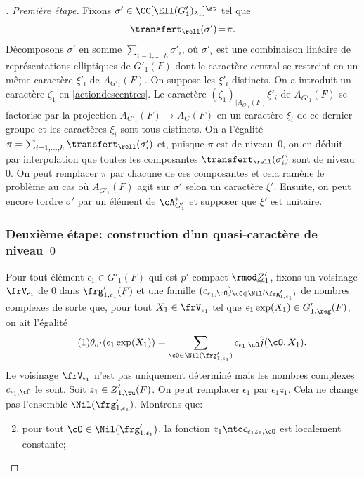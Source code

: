 \begin{proof}[\proofname. Première étape]
Fixons $\sigma'\in\CC[\Ell(G'_{1})_{\lambda_{1}}]^{\st}$ tel que \[
\transfert_{\rell}(\sigma')\!=\!\pi.
\]
Décomposons $\sigma'$ en somme $\sum_{i=1,\dots,h}\sigma'_{i}$, où $\sigma'_{i}$ est une combinaison linéaire de représentations elliptiques de $G'_{1}(F)$ dont le caractère central se restreint en un même carac\-tère $\xi'_{i}$ de $A_{G'_{1}}(F)$. On suppose les $\xi'_{i}$ distincts. On a introduit un caractère $\zeta_{1}$ en \ref{actiondescentres}. Le caractère $(\zeta_{1})_{ \vert A_{G'_{1}}(F)}\xi'_{i}$ de $A_{G'_{1}}(F)$ se factorise par la projection $A_{G'_{1}}(F)\to A_{G}(F)$ en un caractère $\xi_{i}$ de ce dernier groupe et les caractères $\xi_{i}$ sont tous distincts. On a l'égalité $\pi=\sum_{i=1,\dots,h}\transfert_{\rell}(\sigma'_{i})$ et, puisque $\pi$ est de niveau~$0$, on en déduit par interpolation que toutes les composantes $\transfert_{\rell}(\sigma'_{i})$ sont de niveau~$0$. On peut remplacer $\pi$ par chacune de ces composantes et cela ramène le problème au cas où $A_{G'_{1}}(F)$ agit sur $\sigma'$ selon un caractère $\xi'$. Ensuite, on peut encore tordre $\sigma'$ par un élément de $\cA_{G'_{1}}^*$ et supposer que $\xi'$ est unitaire.

\subsubsection*{Deuxième étape: construction d'un quasi-caractère de niveau~$0$}

Pour tout élément $\epsilon_{1}\in G'_{1}(F)$ qui est $p'$-compact $\rmod \underline{Z}'_{1}$, fixons un voisinage $\frV_{\epsilon_{1}}$ de $0$ dans $\frg'_{1,\epsilon_{1}}(F)$ et une famille $(c_{\epsilon_{1},\cO})_{\cO\in \Nil(\frg'_{1,\epsilon_{1}})}$ de nombres complexes de sorte que, pour tout $X_{1}\in \frV_{\epsilon_{1}}$ tel que $\epsilon_{1}\exp(X_{1})\in G'_{1,\reg}(F)$, on ait l'égalité
\begin{equation}\tag{1}\label{unereciproque1}
\theta_{\sigma'}(\epsilon_{1}\exp(X_{1}))=\sum_{\cO\in \Nil(\frg'_{1,\epsilon_{1}})}c_{\epsilon_{1},\cO}\hat{j}(\cO,X_{1}).
\end{equation}
Le voisinage $\frV_{\epsilon_{1}}$ n'est pas uniquement déterminé mais les nombres complexes $c_{\epsilon_{1},\cO}$ le sont. Soit $z_{1}\in \underline{Z}'_{1,\tu}(F)$. On peut remplacer $\epsilon_{1}$ par $\epsilon_{1}z_{1}$. Cela ne change pas l'ensemble $\Nil(\frg'_{1,\epsilon_{1}})$. Montrons que:
\begin{enumerate}\setcounter{enumi}{1}
\item\label{unereciproque2}
pour tout $\cO\in \Nil(\frg'_{1,\epsilon_{1}})$, la fonction $z_{1}\mto c_{\epsilon_{1}z_{1},\cO}$ est localement constante;


\end{enumerate}
\end{proof}
